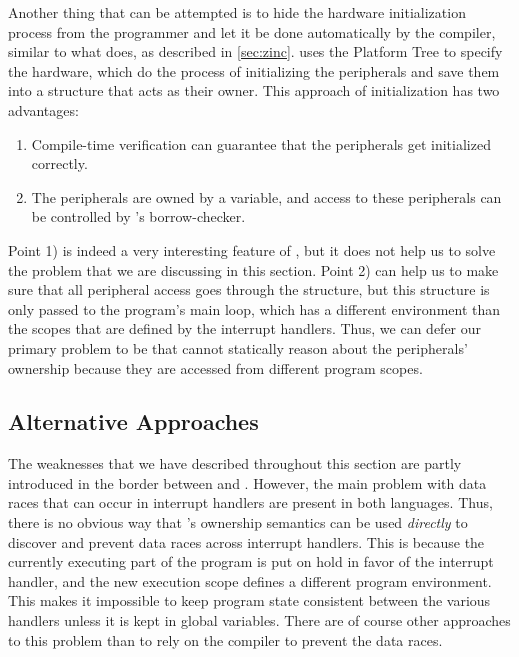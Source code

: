 Another thing that can be attempted is to hide the hardware initialization process from the programmer and let it be done automatically by the compiler, similar to what {\zinc} does, as described in \autoref{sec:zinc}.
{\zinc} uses the Platform Tree to specify the hardware, which do the process of initializing the peripherals and save them into a  structure that acts as their owner.
This approach of initialization has two advantages:

\begin{enumerate}[\hspace{13}1)]
    \item Compile-time verification can guarantee that the peripherals get initialized correctly.
    \item The peripherals are owned by a variable, and access to these peripherals can be controlled by {\rust}'s borrow-checker.
\end{enumerate}

Point 1) is indeed a very interesting feature of {\zinc}, but it does not help us to solve the problem that we are discussing in this section.
Point 2) can help us to make sure that all peripheral access goes through the  structure, but this structure is only passed to the program's main loop, which has a different environment than the scopes that are defined by the interrupt handlers.
Thus, we can defer our primary problem to be that {\rust} cannot statically reason about the peripherals' ownership because they are accessed from different program scopes.

\subsection{Alternative Approaches}

The weaknesses that we have described throughout this section are partly introduced in the border between {\rust} and {\C}.
However, the main problem with data races that can occur in interrupt handlers are present in both languages.
Thus, there is no obvious way that {\rust}'s ownership semantics can be used \emph{directly} to discover and prevent data races across interrupt handlers.
This is because the currently executing part of the program is put on hold in favor of the interrupt handler, and the new execution scope defines a different program environment.
This makes it impossible to keep program state consistent between the various handlers unless it is kept in global variables.
There are of course other approaches to this problem than to rely on the compiler to prevent the data races.

